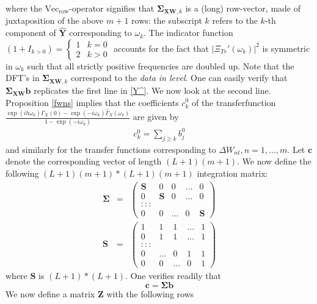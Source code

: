 \documentclass[11pt]{article}
\begin{document}
where the $\textrm{Vec}_\textrm{row}$-operator  signifies that $\mathbf{\Sigma}_{\mathbf{XW},k}$ is a (long) row-vector, made of  juxtaposition of the above $m+1$ rows: the subscript $k$ refers to the $k$-th component of $\mathbf{\hat{Y}}$ corresponding to $\omega_k$. The indicator function $(1+I_{k>0})=\left\{\begin{array}{cc}1& k=0\\2&k>0\end{array}\right.$ accounts for the fact that $\left|\Xi_{Tr}'(\omega_k)\right|^2$ is symmetric in $\omega_k$ such that all strictly positive frequencies are doubled up. Note that the DFT's in $\mathbf{\Sigma}_{\mathbf{XW},k}$ correspond to the \emph{data in level}. One can easily verify that $\mathbf{\Sigma_{XW}b}$ replicates the first line in \ref{Y^}. We now look at the second line. Proposition \ref{fwns} implies that the coefficients 
$c_k^{0}$ of the transferfunction $\displaystyle{\frac{\exp(ih\omega_k)\hat{\Gamma}_{X}(0)-\exp(-i\omega_k)\hat{\Gamma}_{X}(\omega_k)}{1-\exp(-i\omega_k)}}$ are given by
\begin{eqnarray*}
c_k^{0}=\sum_{j\geq k} b_j^0
\end{eqnarray*}
and similarly for the transfer functions corresponding to $\Delta W_{nt}, n=1,...,m$. Let $\mathbf{c}$ denote the corresponding vector of length $(L+1)(m+1)$. We now define the following $(L+1)(m+1)*(L+1)(m+1)$ integration matrix:
\begin{eqnarray*}
\mathbf{\Sigma}&=&\left(\begin{array}{ccccc} \mathbf{S}&0&0&...&0\\
0&\mathbf{S}&0&...&0\\
:::\\
0&0&...&0&\mathbf{S}
\end{array}\right)\\
\mathbf{S}&=&\left(\begin{array}{ccccc} 1&1&1&...&1\\
0&1&1&...&1\\
:::\\
0&...&0&1&1\\
0&0&...&0&1
\end{array}\right)
\end{eqnarray*}
where $\mathbf{S}$ is $(L+1)*(L+1)$. One verifies readily that 
\[\mathbf{c=\Sigma b}\]
We now define a matrix $\mathbf{Z}$ with the following rows
\end{document}
